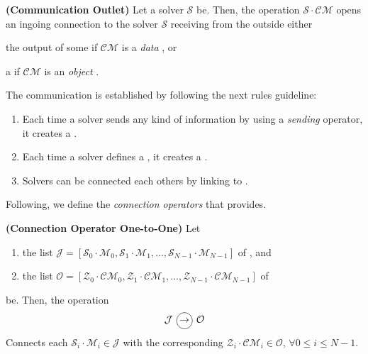 \begin{definition}\label{def:comm_outlet}
{\bf (Communication Outlet)} Let a solver $\mathcal{S}$ be. Then, the operation $\mathcal{S}\cdot\mathcal{CM}$ opens an ingoing connection to the solver $\mathcal{S}$ receiving from the outside either 
\begin{inparaenum}[a)]
	\item the output of some \om{} if $\mathcal{CM}$ is a {\it data} \opch{}, or
	\item a \om{} if $\mathcal{CM}$ is an {\it object} \opch.
\end{inparaenum}
\end{definition} 


The communication is established by following the next rules guideline:
\begin{enumerate}%
	\item Each time a solver sends any kind of information by using a {\it sending} operator, it creates a \jack.
	\item Each time a solver defines a \opch, it creates a \outlet. 
	\item Solvers can be connected each others by linking \jacks{} to \outlets.
\end{enumerate} %


Following, we define the \textit{connection operators} that \posl{} provides.

\begin{definition}\label{op_conn:1to1}
{\bf (Connection Operator One-to-One)} Let 
\begin{enumerate}
\item the list $\mathcal{J} = \left[\mathcal{S}_0\cdot \mathcal{M}_0, \mathcal{S}_1\cdot \mathcal{M}_1, ..., \mathcal{S}_{N-1}\cdot \mathcal{M}_{N-1}\right]$ of \jacks, and
\item the list $\mathcal{O} = \left[\mathcal{Z}_0\cdot \mathcal{CM}_0, \mathcal{Z}_1\cdot \mathcal{CM}_1, ..., \mathcal{Z}_{N-1}\cdot \mathcal{CM}_{N-1}\right]$ of \outlets{}
\end{enumerate} be. Then, the operation 
\[
\mathcal{J} \poslop{\rightarrow} \mathcal{O}
\]
Connects each \jack{} $\mathcal{S}_i\cdot \mathcal{M}_i \in \mathcal{J}$ with the corresponding \outlet{} $\mathcal{Z}_i\cdot \mathcal{CM}_i \in \mathcal{O}$, $\forall 0 \leq i \leq N-1$.
\end{definition}

